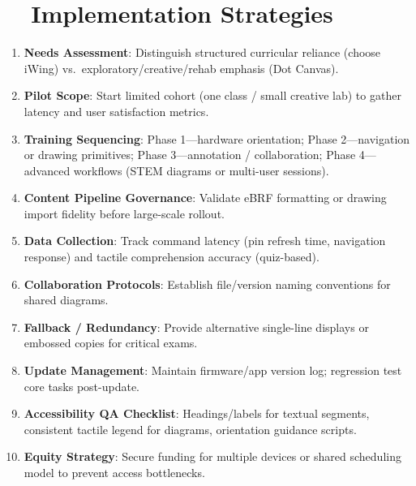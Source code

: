 \section{~~Implementation Strategies}
\label{sec:sr29-implementation}
\begin{enumerate}
	\item \textbf{Needs Assessment}: Distinguish structured curricular reliance (choose iWing) vs.\ exploratory/creative/rehab emphasis (Dot Canvas).
	\item \textbf{Pilot Scope}: Start limited cohort (one class / small creative lab) to gather latency and user satisfaction metrics.
	\item \textbf{Training Sequencing}: Phase 1—hardware orientation; Phase 2—navigation or drawing primitives; Phase 3—annotation / collaboration; Phase 4—advanced workflows (STEM diagrams or multi-user sessions).
	\item \textbf{Content Pipeline Governance}: Validate eBRF formatting or drawing import fidelity before large-scale rollout.
	\item \textbf{Data Collection}: Track command latency (pin refresh time, navigation response) and tactile comprehension accuracy (quiz-based).
	\item \textbf{Collaboration Protocols}: Establish file/version naming conventions for shared diagrams.
	\item \textbf{Fallback / Redundancy}: Provide alternative single-line displays or embossed copies for critical exams.
	\item \textbf{Update Management}: Maintain firmware/app version log; regression test core tasks post-update.
	\item \textbf{Accessibility QA Checklist}: Headings/labels for textual segments, consistent tactile legend for diagrams, orientation guidance scripts.
	\item \textbf{Equity Strategy}: Secure funding for multiple devices or shared scheduling model to prevent access bottlenecks.
\end{enumerate}

